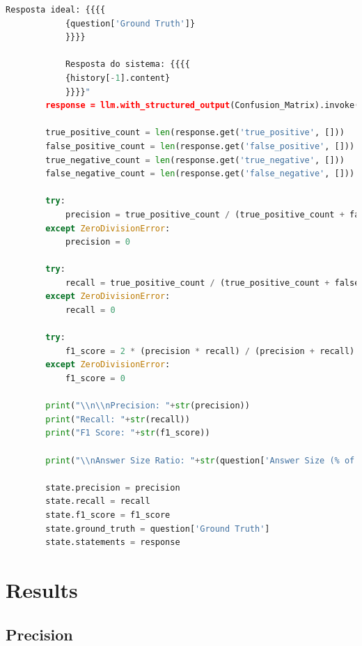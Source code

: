 \begin{lstlisting}[style=mystyle, language=Python, caption={C\'{o}digo para LLM-as-a-Judge}, label={code:llm-judge}]
            Resposta ideal: {{{{
            {question['Ground Truth']}
            }}}}

            Resposta do sistema: {{{{
            {history[-1].content}
            }}}}"
        response = llm.with_structured_output(Confusion_Matrix).invoke(prompt_confusion_matrix)

        true_positive_count = len(response.get('true_positive', []))
        false_positive_count = len(response.get('false_positive', []))
        true_negative_count = len(response.get('true_negative', []))
        false_negative_count = len(response.get('false_negative', []))

        try:
            precision = true_positive_count / (true_positive_count + false_positive_count)
        except ZeroDivisionError:
            precision = 0
        
        try:
            recall = true_positive_count / (true_positive_count + false_negative_count)
        except ZeroDivisionError:
            recall = 0

        try:
            f1_score = 2 * (precision * recall) / (precision + recall)
        except ZeroDivisionError:
            f1_score = 0
            
        print("\\n\\nPrecision: "+str(precision))
        print("Recall: "+str(recall))
        print("F1 Score: "+str(f1_score))

        print("\\nAnswer Size Ratio: "+str(question['Answer Size (% of GT)']))

        state.precision = precision
        state.recall = recall
        state.f1_score = f1_score
        state.ground_truth = question['Ground Truth']
        state.statements = response
\end{lstlisting}

    \section{Results}
    \label{sec:exp2_appendix}

        \subsection{Precision}


